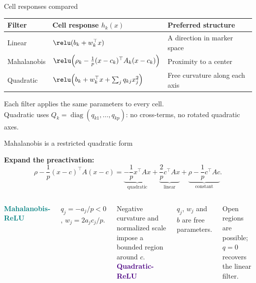 \begin{frame}{Cell responses compared}

\renewcommand{\arraystretch}{1.8}
\begin{tabular}{@{}p{.20\linewidth}p{.45\linewidth}p{.29\linewidth}@{}}\toprule
Filter & Cell response $h_k(x)$ & Preferred structure\\\midrule
Linear & $\relu(b_k+w_k^\top x)$ & A direction in marker space\\
Mahalanobis & $\relu\!\left(\rho_k-\frac1p(x-c_k)^\top A_k(x-c_k)\right)$ & Proximity to a center\\
Quadratic & $\relu\!\left(b_k+w_k^\top x+\sum_j q_{kj}x_j^2\right)$ & Free curvature along each axis\\\bottomrule
\end{tabular}
\vspace{3mm}
Each filter applies the same parameters to every cell.\\
Quadratic uses $Q_k=\operatorname{diag}(q_{k1},\ldots,q_{kp})$: no cross-terms, no rotated quadratic axes.

\end{frame}

\begin{frame}{Mahalanobis is a restricted quadratic form}

\textbf{Expand the preactivation:}
\[\rho-\frac1p(x-c)^\top A(x-c)
=\underbrace{-\frac1p x^\top Ax}_{\text{quadratic}}
+\underbrace{\frac2p c^\top Ax}_{\text{linear}}
+\underbrace{\rho-\frac1p c^\top Ac}_{\text{constant}}.\]
\begin{columns}[T,onlytextwidth]
\textcolor{Teal}{\textbf{Mahalanobis-ReLU}}\par
$q_j=-a_j/p<0$, $w_j=2a_jc_j/p$.\par
Negative curvature and normalized scale impose a bounded region around $c$.
\textcolor{Indigo}{\textbf{Quadratic-ReLU}}\par
$q_j$, $w_j$ and $b$ are free parameters.\par
Open regions are possible; $q=0$ recovers the linear filter.
\end{columns}

\end{frame}

